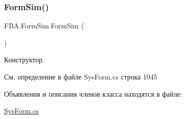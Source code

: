 \subsubsection{\texorpdfstring{Form\+Sim()}{FormSim()}}
{\footnotesize\ttfamily F\+B\+A.\+Form\+Sim.\+Form\+Sim (\begin{DoxyParamCaption}{ }\end{DoxyParamCaption})}



Конструктор. 



См. определение в файле Sys\+Form.\+cs строка 1045



Объявления и описания членов класса находятся в файле\+:\begin{DoxyCompactItemize}
\item 
\mbox{\hyperlink{_sys_form_8cs}{Sys\+Form.\+cs}}\end{DoxyCompactItemize}

